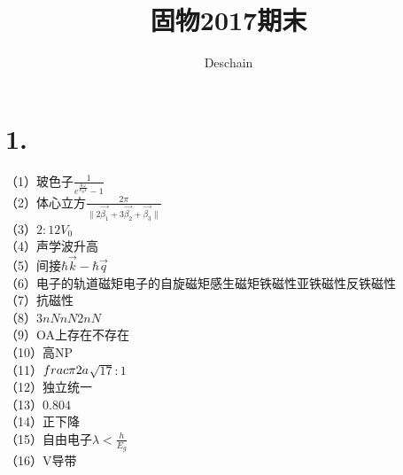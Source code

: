 \documentclass[UTF8]{ctexart}
\title{固物2017期末}
\author{Deschain}
\begin{document}
\maketitle
\section*{1.}
（1）玻色子$\frac{1}{e^{\frac{\hbar\omega}{k_BT}}-1}$\\
（2）体心立方$\frac{2\pi}{\lVert2\vec{\beta_1}+3\vec{\beta_2}+\vec{\beta_3}\rVert}$\\
（3）$2:1$$2V_0$\\
（4）声学波升高\\
（5）间接$\hbar \vec{k}-\hbar \vec{q}$\\
（6）电子的轨道磁矩电子的自旋磁矩感生磁矩铁磁性亚铁磁性反铁磁性\\
（7）抗磁性\\
（8）$3nN$$nN$$2nN$\\
（9）OA上存在不存在\\
（10）高NP\\
（11）$\\frac{\pi}{2a}$$\sqrt{17}:1$\\
（12）独立统一\\
（13）$0.804$\\
（14）正下降\\
（15）自由电子$\lambda<\frac{h}{E_g}$\\
（16）V导带\\
\end{document}
